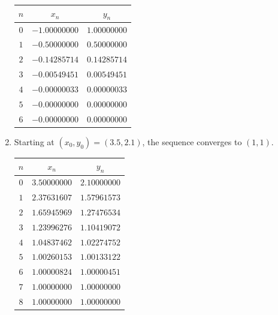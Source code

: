 \begin{example}
\begin{enumerate}
	\begin{center}
	\begin{tabular}{|c|c|c|} \hline 
	$n$ & $x_n$ & $y_n$ \\ \hline \hline 
	$0$ & $-1.00000000$ & $1.00000000$ \\ \hline 
	$1$ & $-0.50000000$ & $0.50000000$ \\ \hline 
	$2$ & $-0.14285714$ & $0.14285714$ \\ \hline 
	$3$ & $-0.00549451$ & $0.00549451$ \\ \hline 
	$4$ & $-0.00000033$ & $0.00000033$ \\ \hline 
	$5$ & $-0.00000000$ & $0.00000000$ \\ \hline 
	$6$ & $-0.00000000$ & $0.00000000$ \\ \hline 
	\end{tabular}
	\end{center}
	\item Starting at $(x_0,y_0) = (3.5, 2.1)$, the sequence converges to $(1,1)$.  %
	\begin{center}
	\begin{tabular}{|c|c|c|} \hline 
	$n$ & $x_n$ & $y_n$ \\ \hline \hline 
	$0$ & $3.50000000$ & $2.10000000$ \\ \hline 
	$1$ & $2.37631607$ & $1.57961573$ \\ \hline 
	$2$ & $1.65945969$ & $1.27476534$ \\ \hline 
	$3$ & $1.23996276$ & $1.10419072$ \\ \hline 
	$4$ & $1.04837462$ & $1.02274752$ \\ \hline 
	$5$ & $1.00260153$ & $1.00133122$ \\ \hline 
	$6$ & $1.00000824$ & $1.00000451$ \\ \hline 
	$7$ & $1.00000000$ & $1.00000000$ \\ \hline 
	$8$ & $1.00000000$ & $1.00000000$ \\ \hline 
	\end{tabular}
	\end{center}

\end{enumerate}
\end{example}
